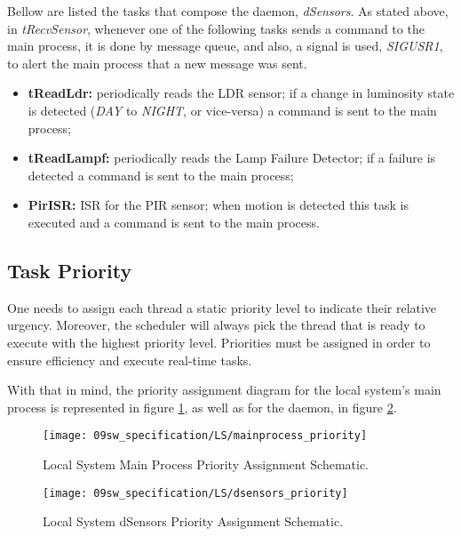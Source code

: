 Bellow are listed the tasks that compose the daemon, \textit{dSensors}. As stated above, in \textit{tRecvSensor}, whenever one of the following tasks sends a command to the main process, it is done by message queue, and also, a signal is used, \textit{SIGUSR1}, to alert the main process that a new message was sent.
\begin{itemize}
	\item \textbf{tReadLdr:} periodically reads the LDR sensor; if a change in luminosity state is detected (\textit{DAY} to \textit{NIGHT}, or vice-versa) a command is sent to the main process;
	\item \textbf{tReadLampf:} periodically reads the Lamp Failure Detector; if a failure is detected a command is sent to the main process;
	\item \textbf{PirISR:} ISR for the PIR sensor; when motion is detected this task is executed and a command is sent to the main process. 
\end{itemize}

\clearpage
\subsection{Task Priority}

One needs to assign each thread a static priority level to indicate their relative urgency. Moreover, the scheduler will always pick the thread that is ready to execute with the highest priority level. Priorities must be assigned in order to ensure efficiency and execute real-time tasks.

With that in mind, the priority assignment diagram for the local system's main process is represented in figure \ref{fig:lst_priority}, as well as for the daemon, in figure \ref{fig:lsdaemont_priority}.

\begin{figure}[H]
	\centering
	\texttt{[image: 09sw\_specification/LS/mainprocess\_priority]}
	\caption{Local System Main Process Priority Assignment Schematic.}
	\label{fig:lst_priority}
\end{figure}

\begin{figure}[H]
	\centering
	\texttt{[image: 09sw\_specification/LS/dsensors\_priority]}
	\caption{Local System dSensors Priority Assignment Schematic.}
	\label{fig:lsdaemont_priority}
\end{figure}

